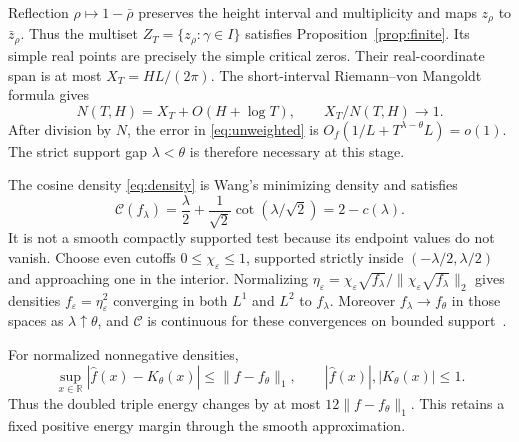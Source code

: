 \documentclass[11pt]{article}
\theoremstyle{remark}
\newcommand{\R}{\mathbb R}
\newcommand{\cC}{\mathcal C}
\begin{document}
Reflection $\rho\mapsto1-\bar\rho$ preserves the height interval and
multiplicity and maps $z_\rho$ to $\bar z_\rho$. Thus the multiset
$Z_T=\{z_\rho:\gamma\in I\}$ satisfies Proposition~\ref{prop:finite}.
Its simple real points are precisely the simple critical zeros. Their
real-coordinate span is at most $X_T=HL/(2\pi)$. The short-interval
Riemann--von Mangoldt formula gives
\begin{equation}\label{eq:normalization}
 N(T,H)=X_T+O(H+\log T),\qquad X_T/N(T,H)\longrightarrow1.
\end{equation}
After division by $N$, the error in \eqref{eq:unweighted} is
$O_f(1/L+T^{\lambda-\theta}L)=o(1)$. The strict support gap
$\lambda<\theta$ is therefore necessary at this stage.

The cosine density \eqref{eq:density} is Wang's minimizing density and
satisfies
\begin{equation}\label{eq:cost}
 \cC(f_\lambda)=\frac\lambda2+
         \frac1{\sqrt2}\cot(\lambda/\sqrt2)=2-c(\lambda).
\end{equation}
It is not a smooth compactly supported test because its endpoint values
do not vanish. Choose even cutoffs $0\le\chi_\varepsilon\le1$, supported
strictly inside $(-\lambda/2,\lambda/2)$ and approaching one in the
interior. Normalizing $\eta_\varepsilon=\chi_\varepsilon\sqrt{f_\lambda}/
\|\chi_\varepsilon\sqrt{f_\lambda}\|_2$ gives densities
$f_\varepsilon=\eta_\varepsilon^2$ converging in both $L^1$ and $L^2$
to $f_\lambda$. Moreover $f_\lambda\to f_\theta$ in those spaces as
$\lambda\uparrow\theta$, and $\cC$ is continuous for these convergences
on bounded support~\cite[Section 4]{Wang}.

For normalized nonnegative densities,
\begin{equation}\label{eq:uniform}
 \sup_{x\in\R}|\widehat f(x)-K_\theta(x)|\le\|f-f_\theta\|_1,
 \qquad |\widehat f(x)|,|K_\theta(x)|\le1.
\end{equation}
Thus the doubled triple energy changes by at most
$12\|f-f_\theta\|_1$. This retains a fixed positive energy margin
through the smooth approximation.
\end{document}

